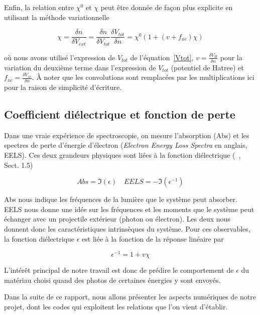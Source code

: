 
Enfin, la relation entre $\chi^0$ et $\chi$ peut être donnée de façon plus explicite en utilisant la méthode variationnelle

\begin{equation}
  \label{eqn-chi0chi}
  \chi = \frac{\delta n}{\delta V_{ext}}
       = \frac{\delta n}{\delta V_{tot}} \frac{\delta V_{tot}}{\delta n}
       = \chi^0 ( 1 + (v+f_{xc})\chi)
\end{equation}

où nous avons utilisé l'expression de $V_{tot}$ de l'équation~\ref{Vtot}, $v = \frac{\delta V_H}{\delta n}$ pour la variation du deuxième terme dans l'expression de $V_{tot}$ (potentiel de Hatree) et $f_{xc} = \frac{\delta V_{xc}}{\delta n}$. À noter que les convolutions sont remplacées par les multiplications ici pour la raison de simplicité d'écriture.


\subsection{Coefficient diélectrique et fonction de perte}
\label{subsec-eels}
Dans une vraie expérience de spectroscopie, on mesure l'absorption (Abs) et les spectres de perte d'énergie d'électron (\textit{Electron Energy Loss Spectra} en anglais, EELS). Ces deux grandeurs physiques sont liées à la fonction diélectrique (~\cite{Sottile2003}, Sect. 1.5)

$$
Abs = \mathfrak{I}(\epsilon) \quad EELS = -\mathfrak{I}(\epsilon^{-1})
$$

Abs nous indique les fréquences de la lumière que le système peut absorber. EELS nous donne une idée sur les fréquences et les moments que le système peut échanger avec un projectile extérieur (photon ou électron). Les deux nous donnent donc les caractéristiques intrinsèques du système. Pour ces observables, la fonction diélectrique $\epsilon$ est liée à la fonction de la réponse linéaire par~\cite{Sottile2003}

\begin{equation}\label{epsilon}
  \epsilon^{-1} = 1+ v\chi
\end{equation}

L'intérêt principal de notre travail est donc de prédire le comportement de $\epsilon$ du matériau choisi quand des photos de certaines énergies y sont envoyés.

Dans la suite de ce rapport, nous allons présenter les aspects numériques de notre projet, dont les codes qui exploitent les relations que l'on vient d'établir.
